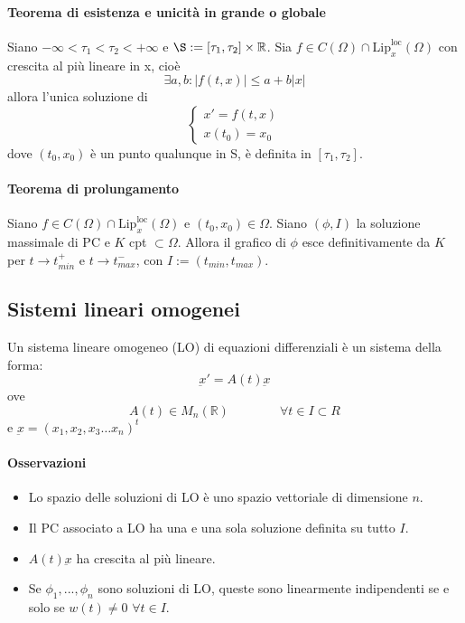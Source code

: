 \documentclass[a4paper,12pt]{article}
\begin{document}
\paragraph{Teorema di esistenza e unicità in grande o globale}
Siano $-\infty < \tau_1 < \tau_2 < +\infty$ e $\S:=\left[\tau_1,\tau_2\right]\times\mathbb{R}$. Sia $f \in C\left(\Omega\right) \cap \text{Lip}^{\text{loc}}_x\left(\Omega\right)$ con crescita al più lineare in x, cioè
$$\exists a,b: |f \left(t,x\right)|\leq a + b|x|$$
allora l'unica soluzione di 
$$\begin{cases} x'=f\left(t,x\right) \\ x\left(t_0\right)=x_0 \end{cases}$$
dove $\left(t_0,x_0\right)$ è un punto qualunque in S, è definita in $\left[\tau_1,\tau_2\right]$.

\paragraph{Teorema di prolungamento}
Siano  $f \in C\left(\Omega\right) \cap \text{Lip}^{\text{loc}}_x\left(\Omega\right)$ e $\left(t_0,x_0\right) \in \Omega$. Siano $\left(\phi,I\right)$ la soluzione massimale di PC e $K$ cpt $\subset \Omega$. Allora il grafico di $\phi$ esce definitivamente da $K$ per $t\rightarrow t^+_{min}$ e $t\rightarrow t^-_{max}$, con $I:=(t_{min},t_{max})$.



\subsection{Sistemi lineari omogenei}
Un sistema lineare omogeneo (LO) di equazioni differenziali è un sistema della forma:
$$\underbar{x}' = A(t)\underbar{x}$$ 
ove $$A(t)\in M_n(\mathbb{R})\qquad \qquad \forall t\in I\subset R$$ e $\underbar{x} = (x_1,x_2,x_3 \dots x_n)^t$
\paragraph{Osservazioni}
\begin{itemize}
 \item Lo spazio delle soluzioni di LO è uno spazio vettoriale di dimensione $n$.
 \item Il PC associato a LO ha una e una sola soluzione definita su tutto $I$.
 \item $A(t)\underbar{x}$ ha crescita al più lineare.
 \item Se $\phi_1,...,\phi_n$ sono soluzioni di LO, queste sono linearmente indipendenti se e solo se $w(t)\neq0$ $\forall t \in I$.
\end{itemize}
\end{document}
